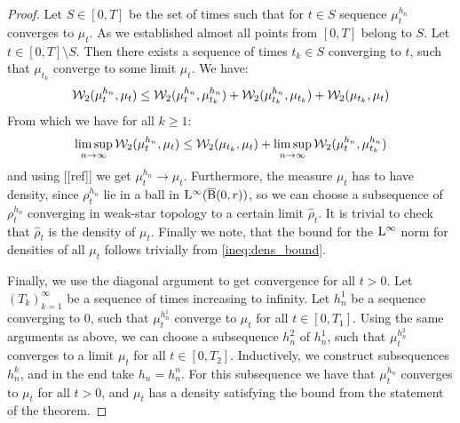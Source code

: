 \begin{proof}
Let $ S \in [0,T]$ be the set of times such that for $t \in S$ sequence $\mu_{t}^{h_n}$ converges to $\mu_t$. As we established almost all points from $[0,T]$ belong to $S$. Let $ t \in [0,T] \setminus S$. Then there exists a sequence of times $t_k \in S$ converging to $t$, such that $\mu_{t_k}$ converge to some limit $\mu_t$. We have:
\[
{\cal W}_2(\mu_t^{h_n}, \mu_t) \leq {\cal W}_2(\mu_{t}^{h_n}, \mu_{t_k}^{h_n}) + {\cal W}_2(\mu_{t_k}^{h_n}, \mu_{t_k}) + {\cal W}_2(\mu_{t_k}, \mu_t)
\]
From which we have for all $k \geq 1$:
\[
\limsup_{n \rightarrow \infty} {\cal W}_2(\mu_{t}^{h_n}, \mu_t) \leq {\cal W}_2(\mu_{t_k}, \mu_t) + \limsup_{n\rightarrow \infty} {\cal W}_2(\mu_t^{h_n}, \mu_{t_k}^{h_n})
\]
and using [[ref]] we get $\mu_{t}^{h_n} \rightarrow \mu_t$. Furthermore, the measure $\mu_t$ has to have density, since $\rho_{t}^{h_n}$ lie in a ball in $\mathrm{L}^{\infty}(\operatorname{\overline{B}}(0,r))$, so we can choose a subsequence of $\rho_t^{h_n}$ converging in weak-star topology to a certain limit $\hat{\rho}_t$. It is trivial to check that $\hat{\rho}_t$ is the density of $\mu_t$. Finally we note, that the bound for the $\mathrm{L}^{\infty}$ norm for densities of all $\mu_t$ follows trivially from \ref{ineq:dens_bound}.

Finally, we use the diagonal argument to get convergence for all $t >0$. Let $(T_k)_{k=1}^{\infty}$ be a sequence of times increasing to infinity. Let $h_{n}^1$ be a sequence converging to $0$, such that $\mu_t^{h_n^1}$ converge to $\mu_t$ for all $t \in [0, T_1]$. Using the same arguments as above, we can choose a subsequence $h_n^2$ of $h_n^1$, such that $\mu_{t}^{h_n^2}$ converges to a limit $\mu_t$ for all $t \in [0, T_2]$. Inductively, we construct subsequences $h_{n}^k$, and in the end take $h_n = h_n^n$. For this subsequence we have that $\mu_t^{h_n}$ converges to $\mu_t$ for all $t > 0$, and $\mu_t$ has a density satisfying the bound from the statement of the theorem.
\end{proof}

